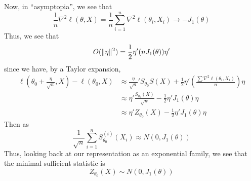 Now, in ``asymptopia'', we see that
\[ \frac{1}{n}\nabla^2\ell(\theta, X) = \frac{1}{n}\sum_{i = 1}^{n} \nabla^2\ell(\theta_i, X_i) \rightarrow -J_{1}(\theta) \]
Thus, we see that
\[ O(\lVert {\eta} \rVert^2) = \frac{1}{2}\eta'(nJ_{1}(\theta))\eta' \]
since we have, by a Taylor expansion,
\begin{align*}
    \ell\left(\theta_0 + \frac{\eta}{\sqrt{n}}, X\right) - \ell(\theta_0, X) &\approx \frac{\eta}{\sqrt{n}}'S_{\theta_0}S(X) + \frac{1}{2}\eta'\left(\frac{\sum \nabla^2 \ell(\theta_i, X_i)}{n}\right)\eta\\
    &\approx \eta' \frac{S_{\theta_0}(X)}{\sqrt{n}} - \frac{1}{2}\eta'J_{1}(\theta)\eta\\
    &\approx \eta'Z_{\theta_0}(X) - \frac{1}{2}\eta'J_{1}(\theta)\eta
\end{align*}
Then as
\[ \frac{1}{\sqrt{n}}\sum_{i = 1}^{n} S_{\theta_0}^{(i)}(X_i) \approx N(0, J_{1}(\theta)) \]
Thus, looking back at our representation as an exponential family, we see that the minimal sufficient statistic is
\[ Z_{\theta_0}(X) \sim N(0, J_{1}(\theta)) \]